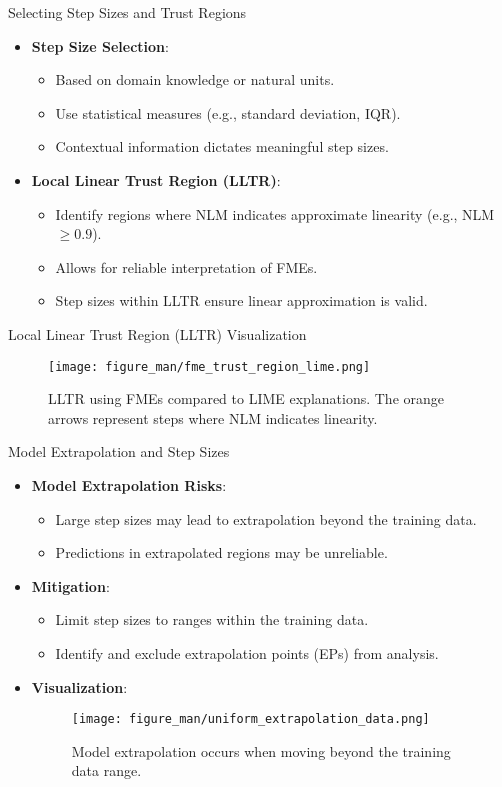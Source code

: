\documentclass[10pt,compress,t,notes=noshow, xcolor=table]{beamer}
\begin{document}
\begin{frame}{Selecting Step Sizes and Trust Regions}
\begin{itemize}
\item \textbf{Step Size Selection}:
\begin{itemize}
  \item Based on domain knowledge or natural units.
  \item Use statistical measures (e.g., standard deviation, IQR).
  \item Contextual information dictates meaningful step sizes.
\end{itemize}
\item \textbf{Local Linear Trust Region (LLTR)}:
\begin{itemize}
  \item Identify regions where NLM indicates approximate linearity (e.g., NLM $\geq 0.9$).
  \item Allows for reliable interpretation of FMEs.
  \item Step sizes within LLTR ensure linear approximation is valid.
\end{itemize}
\end{itemize}
\end{frame}

\begin{frame}{Local Linear Trust Region (LLTR) Visualization}
\begin{figure}
  \centering
  \texttt{[image: figure\_man/fme\_trust\_region\_lime.png]}
  \caption{LLTR using FMEs compared to LIME explanations. The orange arrows represent steps where NLM indicates linearity.}
\end{figure}
\end{frame}

\begin{frame}{Model Extrapolation and Step Sizes}
\begin{itemize}
\item \textbf{Model Extrapolation Risks}:
\begin{itemize}
\item Large step sizes may lead to extrapolation beyond the training data.
\item Predictions in extrapolated regions may be unreliable.
\end{itemize}
\item \textbf{Mitigation}:
\begin{itemize}
\item Limit step sizes to ranges within the training data.
\item Identify and exclude extrapolation points (EPs) from analysis.
\end{itemize}
\item \textbf{Visualization}:
\begin{figure}
  \centering
  \texttt{[image: figure\_man/uniform\_extrapolation\_data.png]}
  \caption{Model extrapolation occurs when moving beyond the training data range.}
\end{figure}
\end{itemize}
\end{frame}
\end{document}

